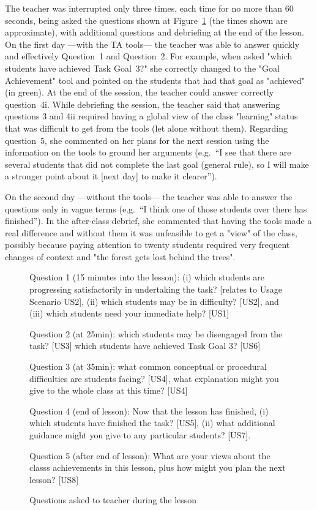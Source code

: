 The teacher was interrupted only three times, each time for no more
than 60 seconds, being asked the questions shown at
Figure~\ref{fig:summquest} (the
times shown are approximate), with additional questions and debriefing
at the end of the lesson. On the first day ---with the TA tools--- the
teacher was able to answer quickly and effectively Question~1 and
Question~2. For example, when asked "which students have achieved Task
Goal~3?" she correctly changed to the "Goal Achievement" tool and
pointed on the students that had that goal as "achieved" (in
green). At the end of the session, the teacher could answer correctly
question~4i. 
%
While debriefing the session, the teacher said that
answering questions 3 and 4ii required having a global view of the
class "learning" status that was difficult to get from the tools (let
alone without them).
%
Regarding question~5, she commented on her plans for the next session
using the information on the tools to ground her arguments (e.g.~``I
see that there are several students that did not complete the last
goal (general rule), so I will make a stronger point about it [next
day] to make it clearer'').

On the second day ---without the tools--- the teacher was able to
answer the questions only in vague terms (e.g.~``I think one of
those students over there has finished''). In the after-class debrief,
she commented that having the tools made a real difference and without
them it was unfeasible to get a "view" of the class, possibly because
paying attention to twenty students required very frequent changes of
context and "the forest gets lost behind the trees".

\begin{figure}[hbtp]
  \centering
  Question 1 (15 minutes into the lesson): (i) which students are
  progressing satisfactorily in undertaking the task? [relates to
  Usage Scenario US2], (ii) which students may be in difficulty?
  [US2], and (iii) which students need your immediate help? [US1]

  Question 2 (at 25min): which students may be disengaged from the task?
  [US3] which students have achieved Task Goal 3? [US6]

  Question 3 (at 35min): what common conceptual or procedural
  difficulties are students facing? [US4], what explanation might you
  give to the whole class at this time? [US4]

  Question 4 (end of lesson): Now that the lesson has finished,
  (i) which students have finished the task? [US5], (ii) what
  additional guidance might you give to any particular students?
  [US7].

  Question 5 (after end of lesson): What are your views about the
  classs achievements in this lesson, plus how might you plan the next
  lesson? [US8]
  \caption{Questions asked to teacher during the lesson}
  \label{fig:summquest}
\end{figure}




